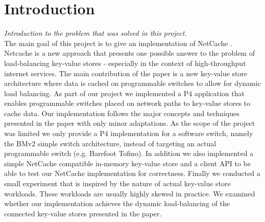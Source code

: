 \documentclass[11pt,oneside,a4paper]{article}
\newcommand{\hint}[1]{{\color{blue} \em #1}}
\begin{document}
\section{Introduction}
\hint{Introduction to the problem that was solved in this project.} \\
The main goal of this project is to give an implementation of NetCache  \cite{jin2017netcache}.
Netcache is a new approach that presents one possible answer to the  problem of load-balancing key-value stores - especially in the context of high-throughput internet services.
The main contribution of the paper is a new key-value store architecture where data is cached on programmable switches to allow for dynamic load balancing.
As part of our project we implemented a P4 application that enables programmable switches placed on network paths to key-value stores to cache data.
Our implementation follows the major concepts and techniques presented in the paper with only minor adaptations.
As the scope of the project was limited we only provide a P4 implementation for a software switch, namely the BMv2 simple switch architecture, instead of targeting an actual programmable switch (e.g. Barefoot Tofino).
In addition we also implemented a simple NetCache compatible in-memory key-value store and a client API to be able to test our NetCache implementation for correctness.
Finally we conducted a small experiment that is inspired by the nature of actual key-value store workloads.
These workloads are usually highly skewed in practice.
We examined whether our implementation achieves the dynamic load-balancing of the connected key-value stores presented in the paper.
\end{document}

